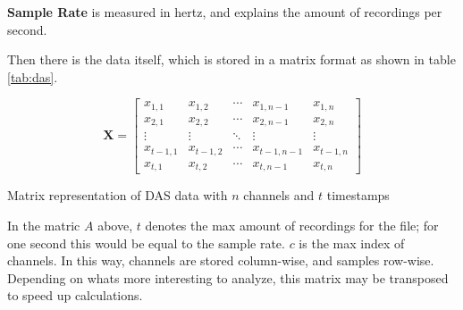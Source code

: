 \textbf{Sample Rate} is measured in hertz, and explains the amount of recordings per second.

Then there is the data itself, which is stored in a matrix format as shown in table \ref{tab:das}.

\begin{table}[h]
\centering
\begin{equation*}
\mathbf{X} = \begin{bmatrix}
x_{1,1} & x_{1,2} & \cdots & x_{1,n-1} & x_{1,n} \\
x_{2,1} & x_{2,2} & \cdots & x_{2,n-1} & x_{2,n} \\
\vdots & \vdots & \ddots & \vdots & \vdots \\
x_{t-1,1} & x_{t-1,2} & \cdots & x_{t-1,n-1} & x_{t-1,n} \\
x_{t,1} & x_{t,2} & \cdots & x_{t,n-1} & x_{t,n}
\end{bmatrix}
\end{equation*}
\caption{Matrix representation of DAS data with $n$ channels and $t$ timestamps}
\label{fig:dasmatrix}
\end{table}


In the matric $A$ above, $t$ denotes the max amount of recordings for the file; for one second this would be equal to the sample rate. $c$ is the max index of channels. In this way, channels are stored column-wise, and samples row-wise. Depending on whats more interesting to analyze, this matrix may be transposed to speed up calculations.